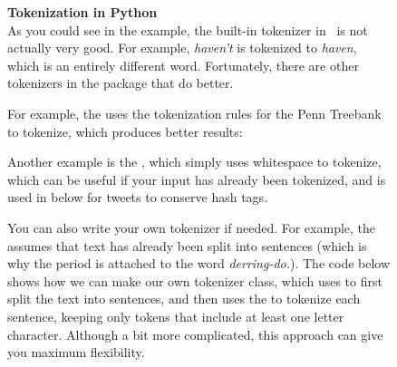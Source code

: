 \begin{figure}
\begin{feature}\textbf{Tokenization in Python}\\
  As you could see in the example, the built-in tokenizer in \sklearn\ is not actually very good.
  For example, \emph{haven't} is tokenized to \emph{haven}, which is an entirely different word.
  Fortunately, there are other tokenizers in the  package that do better.

  For example, the  uses the tokenization rules for the Penn Treebank
  to tokenize, which produces better results:

  
  Another example is the , which simply uses whitespace to tokenize,
  which can be useful if your input has already been tokenized,
  and is used in  below for tweets to conserve hash tags.


  You can also write your own tokenizer if needed.
  For example, the  assumes that text has already been split into sentences
  (which is why the period is attached to the word \emph{derring-do.}).
  The code below shows how we can make our own tokenizer class,
  which uses  to first split the text into sentences,
  and then uses the  to tokenize each sentence,
  keeping only tokens that include at least one letter character.
  Although a bit more complicated, this approach can give you maximum flexibility.

\end{feature}
\end{figure}

\begin{ccsexample}
  \begin{tcbraster}[raster columns=2,raster equal height=rows,raster valign=top]
  \begin{tcolorbox}[title=Python Output]
      \texttt{[image: \{chapter11/haiku.py]}.png}
  \end{tcolorbox}%
  \begin{tcolorbox}[title=R Output]
      \texttt{[image: \{chapter11/haiku.r]}.png}
  \end{tcolorbox}%
\end{tcbraster}
  \caption{Tokenization of Japanese verse}\label{ex:haiku}
\end{ccsexample}



